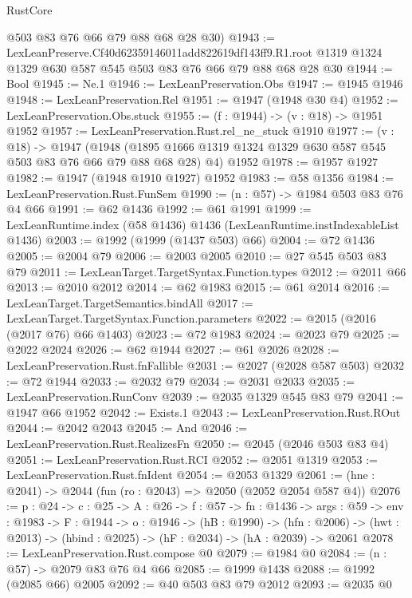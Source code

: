 \begin{lexlean}{RustCore}
\begin{coremodule}
      @503
      @83
      @76
      @66
      @79
      @88
      @68
      @28
      @30)
@1943 := LexLeanPreserve.Cf40d62359146011add822619df143ff9.R1.root
    @1319
    @1324
    @1329
    @630
    @587
    @545
    @503
    @83
    @76
    @66
    @79
    @88
    @68
    @28
    @30
@1944 := Bool
@1945 := Ne.{1}
@1946 := LexLeanPreservation.Obs
@1947 := @1945 @1946
@1948 := LexLeanPreservation.Rel
@1951 := @1947 (@1948 @30 @4)
@1952 := LexLeanPreservation.Obs.stuck
@1955 := (f : @1944) -> (v : @18) -> @1951 @1952
@1957 := LexLeanPreservation.Rust.rel_ne_stuck @1910
@1977 := (v : @18) ->
  @1947
    (@1948 (@1895 @1666 @1319 @1324 @1329 @630 @587 @545 @503 @83 @76 @66 @79 @88 @68 @28) @4)
    @1952
@1978 := @1957 @1927
@1982 := @1947 (@1948 @1910 @1927) @1952
@1983 := @58 @1356
@1984 := LexLeanPreservation.Rust.FunSem
@1990 := (n : @57) -> @1984 @503 @83 @76 @4 @66
@1991 := @62 @1436
@1992 := @61 @1991
@1999 := LexLeanRuntime.index (@58 @1436) @1436 (LexLeanRuntime.instIndexableList @1436)
@2003 := @1992 (@1999 (@1437 @503) @66)
@2004 := @72 @1436
@2005 := @2004 @79
@2006 := @2003 @2005
@2010 := @27 @545 @503 @83 @79
@2011 := LexLeanTarget.TargetSyntax.Function.types
@2012 := @2011 @66
@2013 := @2010 @2012
@2014 := @62 @1983
@2015 := @61 @2014
@2016 := LexLeanTarget.TargetSemantics.bindAll
@2017 := LexLeanTarget.TargetSyntax.Function.parameters
@2022 := @2015 (@2016 (@2017 @76) @66 @1403)
@2023 := @72 @1983
@2024 := @2023 @79
@2025 := @2022 @2024
@2026 := @62 @1944
@2027 := @61 @2026
@2028 := LexLeanPreservation.Rust.fnFallible
@2031 := @2027 (@2028 @587 @503)
@2032 := @72 @1944
@2033 := @2032 @79
@2034 := @2031 @2033
@2035 := LexLeanPreservation.RunConv
@2039 := @2035 @1329 @545 @83 @79
@2041 := @1947 @66 @1952
@2042 := Exists.{1}
@2043 := LexLeanPreservation.Rust.ROut
@2044 := @2042 @2043
@2045 := And
@2046 := LexLeanPreservation.Rust.RealizesFn
@2050 := @2045 (@2046 @503 @83 @4)
@2051 := LexLeanPreservation.Rust.RCI
@2052 := @2051 @1319
@2053 := LexLeanPreservation.Rust.fnIdent
@2054 := @2053 @1329
@2061 := (hne : @2041) -> @2044 (fun (ro : @2043) => @2050 (@2052 @2054 @587 @4))
@2076 := {p : @24} ->
  {c : @25} ->
  {A : @26} ->
  {f : @57} ->
  {fn : @1436} ->
  {args : @59} ->
  {env : @1983} ->
  {F : @1944} ->
  {o : @1946} ->
  (hB : @1990) ->
  (hfn : @2006) -> (hwt : @2013) -> (hbind : @2025) -> (hF : @2034) -> (hA : @2039) -> @2061
@2078 := LexLeanPreservation.Rust.compose @0
@2079 := @1984 @0
@2084 := (n : @57) -> @2079 @83 @76 @4 @66
@2085 := @1999 @1438
@2088 := @1992 (@2085 @66) @2005
@2092 := @40 @503 @83 @79 @2012
@2093 := @2035 @0

\end{coremodule}
\end{lexlean}
